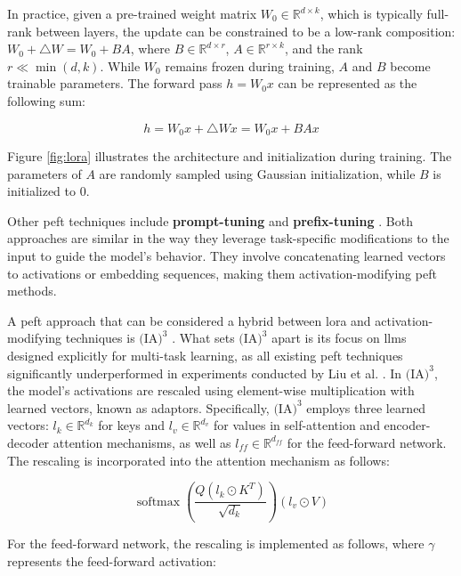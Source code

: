 In practice, given a pre-trained weight matrix \(W_0 \in \mathbb{R}^{d \times k}\), which is typically full-rank between layers, the update can be constrained to be a low-rank composition: \(W_0 + \triangle W = W_0 + BA\), where \(B \in \mathbb{R}^{d \times r}\), \(A \in \mathbb{R}^{r \times k}\), and the rank \(r \ll \min(d, k)\). While \(W_0\) remains frozen during training, \(A\) and \(B\) become trainable parameters. The forward pass \(h = W_0x\) can be represented as the following sum:

\begin{equation}
    h = W_0x + \triangle Wx = W_0x + BAx
\end{equation}

Figure \ref{fig:lora} illustrates the architecture and initialization during training. The parameters of \(A\) are randomly sampled using Gaussian initialization, while \(B\) is initialized to 0.

Other \gls{peft} techniques include \textbf{prompt-tuning} \cite{lester_power_2021} and \textbf{prefix-tuning} \cite{li_prefix-tuning_2021}. Both approaches are similar in the way they leverage task-specific modifications to the input to guide the model's behavior. They involve concatenating learned vectors to activations or embedding sequences, making them activation-modifying \gls{peft} methods.

A \gls{peft} approach that can be considered a hybrid between \gls{lora} and activation-modifying techniques is \textbf{$\text{(IA)}^3$} \cite{liu_few-shot_2022}. What sets $\text{(IA)}^3$ apart is its focus on \gls{llm}s designed explicitly for multi-task learning, as all existing \gls{peft} techniques significantly underperformed in experiments conducted by Liu et al. \cite{liu_few-shot_2022}. In $\text{(IA)}^3$, the model's activations are rescaled using element-wise multiplication with learned vectors, known as adaptors. Specifically, $\text{(IA)}^3$ employs three learned vectors: \(l_k \in \mathbb{R}^{d_k}\) for keys and \(l_v \in \mathbb{R}^{d_v}\) for values in self-attention and encoder-decoder attention mechanisms, as well as \(l_{ff} \in \mathbb{R}^{d_{ff}}\) for the feed-forward network. The rescaling is incorporated into the attention mechanism as follows:

\begin{equation}
    \operatorname{softmax}\left(\frac{Q\left(l_{k} \odot K^T\right)}{\sqrt{d_k}}\right)\left(l_{v} \odot V\right)
\end{equation}

For the feed-forward network, the rescaling is implemented as follows, where \(\gamma\) represents the feed-forward activation:

